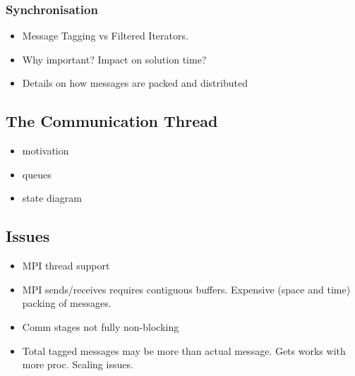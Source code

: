 \subsubsection{Synchronisation}

\begin{itemize}
\item Message Tagging vs Filtered Iterators.
\item Why important? Impact on solution time?
\item Details on how messages are packed and distributed
\end{itemize} 

\subsection{The Communication Thread}

\begin{itemize}
\item motivation
\item queues
\item state diagram
\end{itemize} 


\subsection{Issues}

\begin{itemize}
\item MPI thread support
\item MPI sends/receives requires contiguous buffers. Expensive (space and time) packing of messages.
\item Comm stages not fully non-blocking
\item Total tagged messages may be more than actual message. Gets works with more proc. Scaling issues.
\end{itemize} 

